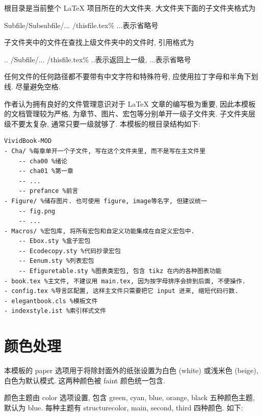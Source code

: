 \documentclass[../book.tex]{subfiles}
\begin{document}
根目录是当前整个 \LaTeX{} 项目所在的大文件夹. 大文件夹下面的子文件夹格式为
\begin{center}
    Subfile/Subsubfile/... /thisfile.tex\quad \% ...表示省略号
\end{center}
子文件夹中的文件在查找上级文件夹中的文件时, 引用格式为
\begin{center}
    .. /Subfile/... /thisfile.tex\quad \% ..表示返回上一级, ...表示省略号
\end{center}
任何文件的任何路径都不要带有中文字符和特殊符号, 应使用拉丁字母和半角下划线. 尽量避免空格.

作者认为拥有良好的文件管理意识对于 \LaTeX{} 文章的编写极为重要, 因此本模板的文档管理较为严格, 为章节、图片、宏包等分别单开一级子文件夹. 子文件夹层级不要太复杂, 通常只要一级就够了. 本模板的根目录结构如下: 

\begin{lstlisting}
VividBook-MOD
- Cha/ %每章单开一个子文件, 写在这个文件夹里, 而不是写在主文件里
    -- cha00 %绪论
    -- cha01 %第一章
    -- ...
    -- prefance %前言
- Figure/ %储存图片. 也可使用 figure, image等名字, 但建议统一
    -- fig.png
    -- ...
- Macros/ %宏包库, 将所有宏包和自定义功能集成在自定义宏包中.
    -- Ebox.sty %盒子宏包
    -- Ecodecopy.sty %代码抄录宏包
    -- Eenum.sty %列表宏包
    -- Efiguretable.sty %图表类宏包, 包含 tikz 在内的各种图表功能
- book.tex %主文件, 不建议用 main.tex, 因为按字母排序会排到后面, 不便操作.
- config.tex %导言区配置, 这样主文件只需要把它 input 进来, 缩短代码行数.
- elegantbook.cls %模板文件
- indexstyle.ist %索引样式文件
\end{lstlisting}

\section{颜色处理}

本模板的 paper 选项用于将除封面外的纸张设置为白色 (white) 或浅米色 (beige), 白色为默认模式. 这两种颜色被 faint 颜色统一包含.

颜色主题由 color 选项设置, 包含 green, cyan, blue, orange, black 五种颜色主题, 默认为 blue. 每种主题有 structurecolor, main, second, third 四种颜色. 如下:
\end{document}
